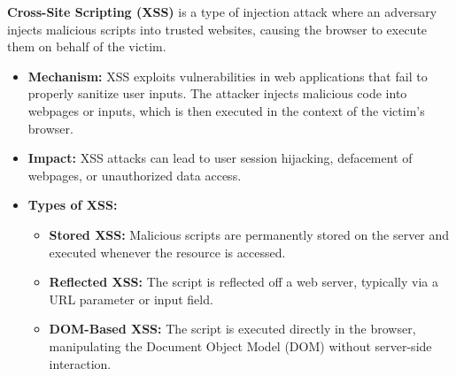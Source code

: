 \begin{theo}
    \label{theo:xss}
    \textbf{Cross-Site Scripting (XSS)} is a type of injection attack where an adversary injects malicious scripts into trusted websites, causing the browser to execute them on behalf of the victim. 
    
    \begin{itemize}
        \item \textbf{Mechanism:} 
        XSS exploits vulnerabilities in web applications that fail to properly sanitize user inputs. The attacker injects malicious code into webpages or inputs, which is then executed in the context of the victim's browser.
    
        \item \textbf{Impact:} 
        XSS attacks can lead to user session hijacking, defacement of webpages, or unauthorized data access.
    
        \item \textbf{Types of XSS:}
        \begin{itemize}
            \item \textbf{Stored XSS:} Malicious scripts are permanently stored on the server and executed whenever the resource is accessed.
            \item \textbf{Reflected XSS:} The script is reflected off a web server, typically via a URL parameter or input field.
            \item \textbf{DOM-Based XSS:} The script is executed directly in the browser, manipulating the Document Object Model (DOM) without server-side interaction.
        \end{itemize}
    \end{itemize}
    
\end{theo}
    

